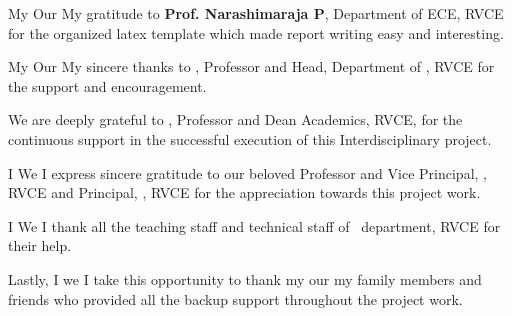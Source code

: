 \ifPG My \else \ifStuNameBUsed Our \else My \fi\fi gratitude to \textbf{Prof. Narashimaraja P}, Department of ECE, RVCE for the organized latex template which made report writing easy and interesting.\\ \par


\ifPG My \else \ifStuNameBUsed Our \else My \fi\fi sincere thanks to \textbf{\printHOD}, Professor and Head, Department of \ifIDP \printGuideDeptAInLF\else\printDepartmentLF\fi, RVCE for the support and encouragement.\\ \par

\ifIDP
We are deeply grateful to \textbf{\printDA}, Professor and Dean Academics, RVCE, for the continuous support in the successful execution of this Interdisciplinary project.
\\ \par
\fi
\ifPG I \else \ifStuNameBUsed We \else I \fi\fi express sincere gratitude to our beloved Professor and Vice Principal, \textbf{\printVicePrincipal}, RVCE and Principal, \textbf{\printPrincipal}, RVCE for the appreciation towards this project work.\\ \par

\ifIDP \else\ifPG I \else\ifStuNameBUsed We \else I \fi\fi thank all the teaching staff and technical staff of \ifIDP \printGuideDeptAInLF\else\printDepartmentLF\fi\, department, RVCE for their help.\\ \par \fi

Lastly, \ifPG I \else\ifStuNameBUsed we \else I \fi\fi take this opportunity to thank \ifPG my \else\ifStuNameBUsed our \else my \fi\fi family members and friends who provided all the backup support throughout the project work.\\ \par

